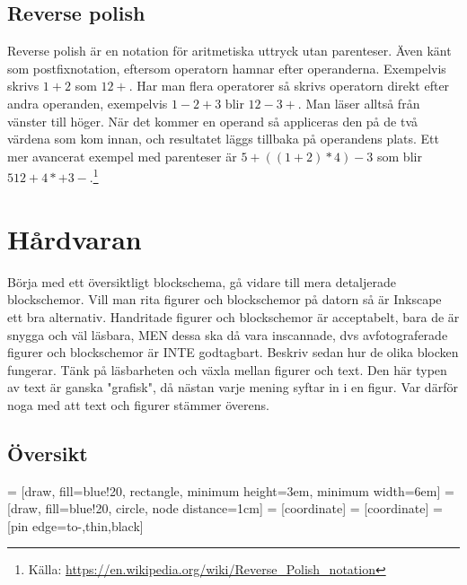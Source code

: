 \documentclass[]{article}
\begin{document}
\subsection{Reverse polish}
Reverse polish är en notation för aritmetiska uttryck utan parenteser. Även känt som postfixnotation, eftersom operatorn hamnar efter operanderna. Exempelvis skrivs $1+2$ som $1 2 +$. Har man flera operatorer så skrivs operatorn direkt efter andra operanden, exempelvis $1-2+3$ blir $1 2 - 3 +$. Man läser alltså från vänster till höger. När det kommer en operand så appliceras den på de två värdena som kom innan, och resultatet läggs tillbaka på operandens plats. Ett mer avancerat exempel med parenteser är $5 + ((1 + 2) * 4) - 3$ som blir $5 1 2 + 4 * + 3 -$.\footnote{Källa: \href{https://en.wikipedia.org/wiki/Reverse_Polish_notation}{\url{https://en.wikipedia.org/wiki/Reverse_Polish_notation}}}
\section{Hårdvaran}
Börja med ett översiktligt blockschema, gå vidare till mera detaljerade blockschemor. Vill man rita figurer och blockschemor på datorn så är Inkscape ett bra alternativ. Handritade figurer och blockschemor är acceptabelt, bara de är snygga och väl läsbara, MEN dessa ska då vara inscannade, dvs avfotograferade figurer och blockschemor är INTE godtagbart.
Beskriv sedan hur de olika blocken fungerar. Tänk på läsbarheten och växla mellan figurer och text. Den här typen av text är ganska "grafisk", då nästan varje mening syftar in i en figur. Var därför noga med att text och figurer stämmer överens.

\newpage

\subsection{Översikt}

 = [draw, fill=blue!20, rectangle, 
minimum height=3em, minimum width=6em]
 = [draw, fill=blue!20, circle, node distance=1cm]
 = [coordinate]
 = [coordinate]
 = [pin edge={to-,thin,black}]
\end{document}
